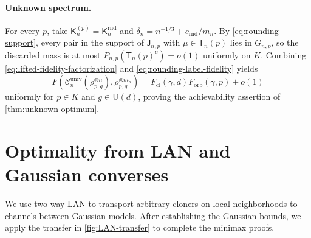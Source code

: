 \documentclass[11pt]{article}
\theoremstyle{remark}
\theoremstyle{plain}
\newcommand{\cC}{\mathcal C}
\newcommand{\U}{\mathrm U}
\newcommand{\ot}{\otimes}
\newcommand{\Forb}{F_{\mathrm{orb}}}
\newcommand{\Fcl}{F_{\mathrm{cl}}}
\begin{document}
\paragraph{Unknown spectrum.}
For every \(p\), take \(\mathsf K_n^{(p)}=\mathsf K_n^{\mathrm{rnd}}\) and
\(\delta_n=n^{-1/3}+c_{\mathrm{rnd}}/m_n\).  By
\eqref{eq:rounding-support}, every pair in the support of
\(\mathsf J_{n,p}\) with \(\mu\in\mathsf T_n(p)\) lies in \(G_{n,p}\), so the
discarded mass is at most \(P_{n,p}(\mathsf T_n(p)^c)=o(1)\) uniformly on
\(K\).  Combining
\eqref{eq:lifted-fidelity-factorization} and
\eqref{eq:rounding-label-fidelity} yields
\[
 F\!\left(\cC_n^{\mathrm{univ}}(\rho_{p,g}^{\ot n}),
                                    \rho_{p,g}^{\ot m_n}\right)
 =\Fcl(\gamma,d)\Forb(\gamma,p)+o(1)
\]
uniformly for \(p\in K\) and \(g\in\U(d)\), proving the achievability
assertion of \cref{thm:unknown-optimum}.

\section{Optimality from LAN and Gaussian converses}\label{sec:gaussian-LAN}

We use two-way LAN to transport arbitrary cloners on local neighborhoods to
channels between Gaussian models.  After establishing the Gaussian bounds,
we apply the transfer in \cref{fig:LAN-transfer} to complete the minimax
proofs.
\end{document}
